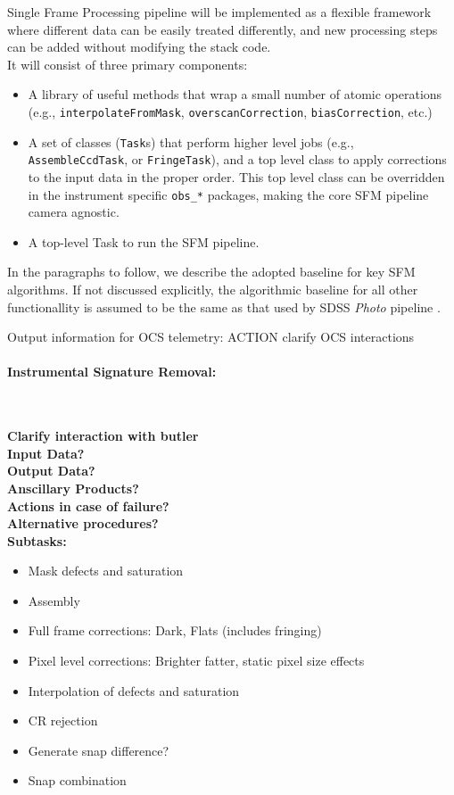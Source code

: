 Single Frame Processing pipeline will be implemented as a flexible framework where different data can be easily treated differently, and new processing steps can be added without modifying the stack code.
\\

It will consist of three primary components:
%
\begin{itemize}
    \item A library of useful methods that wrap a small number of atomic operations (e.g., {\tt interpolateFromMask}, {\tt overscanCorrection}, {\tt biasCorrection}, etc.) %
    \item A set of classes ({\tt Task}s) that perform higher level jobs
    (e.g., {\tt AssembleCcdTask}, or {\tt FringeTask}), and a top level class to apply corrections to the input data in the proper order. This top level class can be overridden in the instrument specific {\tt obs\_*} packages, making the core SFM pipeline camera agnostic.
    \item A top-level Task to run the SFM pipeline.
\end{itemize}

In the paragraphs to follow, we describe the adopted baseline for key SFM algorithms. If not discussed explicitly, the algorithmic baseline for all other functionallity is assumed to be the same as that used by SDSS \emph{Photo} pipeline \cite{LuptonPhoto}.

Output information for OCS telemetry: ACTION clarify OCS interactions

\paragraph{Instrumental Signature Removal:}~

\noindent
{\bf Clarify interaction with butler}\\

\noindent
{\bf Input Data?}\\
{\bf Output Data?}\\
{\bf Anscillary Products?}\\
{\bf Actions in case of failure?}\\
{\bf Alternative procedures?}\\

\noindent
{\bf Subtasks:}
\begin{itemize}
\item Mask defects and saturation
\item Assembly
\item Full frame corrections: Dark, Flats (includes fringing)
\item Pixel level corrections: Brighter fatter, static pixel size effects
\item Interpolation of defects and saturation
\item CR rejection
\item Generate snap difference?
\item Snap combination
\end{itemize}


